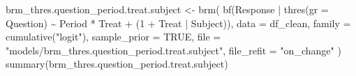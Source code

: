 \documentclass[
  12pt,
  a4paper,
  extrafontsizes,
  onecolumn,
  openright]{memoir}
\newenvironment{Shaded}{\begin{snugshade}}{\end{snugshade}}
\newcommand{\AttributeTok}[1]{\textcolor[rgb]{0.40,0.45,0.13}{#1}}
\newcommand{\ConstantTok}[1]{\textcolor[rgb]{0.56,0.35,0.01}{#1}}
\newcommand{\DecValTok}[1]{\textcolor[rgb]{0.68,0.00,0.00}{#1}}
\newcommand{\FunctionTok}[1]{\textcolor[rgb]{0.28,0.35,0.67}{#1}}
\newcommand{\NormalTok}[1]{\textcolor[rgb]{0.00,0.23,0.31}{#1}}
\newcommand{\OtherTok}[1]{\textcolor[rgb]{0.00,0.23,0.31}{#1}}
\newcommand{\SpecialCharTok}[1]{\textcolor[rgb]{0.37,0.37,0.37}{#1}}
\newcommand{\StringTok}[1]{\textcolor[rgb]{0.13,0.47,0.30}{#1}}
\begin{document}
\begin{Shaded}
\begin{Highlighting}[]
\NormalTok{brm\_thres.question\_period.treat.subject }\OtherTok{\textless{}{-}} \FunctionTok{brm}\NormalTok{(}
    \FunctionTok{bf}\NormalTok{(Response }\SpecialCharTok{|} \FunctionTok{thres}\NormalTok{(}\AttributeTok{gr =}\NormalTok{ Question) }\SpecialCharTok{\textasciitilde{}}\NormalTok{ Period }\SpecialCharTok{*}\NormalTok{ Treat }\SpecialCharTok{+}\NormalTok{ (}\DecValTok{1} \SpecialCharTok{+}\NormalTok{ Treat }\SpecialCharTok{|}\NormalTok{ Subject)),}
    \AttributeTok{data =}\NormalTok{ df\_clean,}
    \AttributeTok{family =} \FunctionTok{cumulative}\NormalTok{(}\StringTok{"logit"}\NormalTok{),}
    \AttributeTok{sample\_prior =} \ConstantTok{TRUE}\NormalTok{,}
    \AttributeTok{file =} \StringTok{"models/brm\_thres.question\_period.treat.subject"}\NormalTok{,}
    \AttributeTok{file\_refit =} \StringTok{"on\_change"}
\NormalTok{)}
\FunctionTok{summary}\NormalTok{(brm\_thres.question\_period.treat.subject)}
\end{Highlighting}
\end{Shaded}
\end{document}
